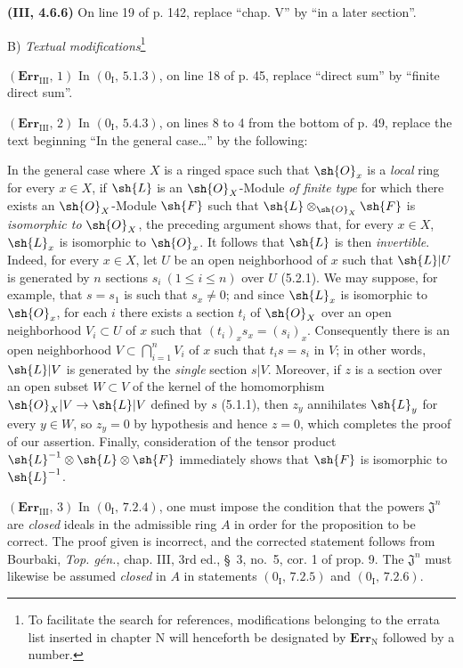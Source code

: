 \noindent\textbf{(III, 4.6.6)} On line 19 of p. 142, replace ``chap. V'' by
``in a later section''.

\begin{center}
B) \emph{Textual modifications}\footnote{To facilitate the search for
references, modifications belonging to the errata list inserted in chapter N
will henceforth be designated by $\mathbf{Err}_{\mathrm N}$ followed by a
number.}
\end{center}

\noindent\textbf{$(\mathbf{Err}_{\mathrm{III}},\,1)$} In
$(0_{\mathrm I},\,5.1.3)$, on line 18 of p. 45, replace ``direct sum'' by
``finite direct sum''.

\noindent\textbf{$(\mathbf{Err}_{\mathrm{III}},\,2)$} In
$(0_{\mathrm I},\,5.4.3)$, on lines 8 to 4 from the bottom of p. 49, replace
the text beginning ``In the general case\ldots{}'' by the following:

In the general case where $X$ is a ringed space such that $\sh{O}_x$ is a
\emph{local} ring for
every $x\in X$, if $\sh{L}$ is an $\sh{O}_X$-Module \emph{of finite type} for
which there exists an $\sh{O}_X$-Module $\sh{F}$ such that
$\sh{L}\otimes_{\sh{O}_X}\sh{F}$ is \emph{isomorphic to} $\sh{O}_X$, the
preceding argument shows that, for every $x\in X$, $\sh{L}_x$ is isomorphic to
$\sh{O}_x$. It follows that $\sh{L}$ is then \emph{invertible}. Indeed, for
every $x\in X$, let $U$ be an open neighborhood of $x$ such that $\sh{L}|U$ is
generated by $n$ sections $s_i\ (1\leq i\leq n)$ over $U$ (5.2.1). We may
suppose, for example, that $s=s_1$ is such that $s_x\ne0$; and since
$\sh{L}_x$ is isomorphic to $\sh{O}_x$, for each $i$ there exists a section
$t_i$ of $\sh{O}_X$ over an open neighborhood $V_i\subset U$ of $x$ such that
$(t_i)_x s_x=(s_i)_x$. Consequently there is an open neighborhood
$V\subset\bigcap_{i=1}^nV_i$ of $x$ such that $t_i s=s_i$ in $V$; in other
words, $\sh{L}|V$ is generated by the \emph{single} section $s|V$. Moreover,
if $z$ is a section over an open subset $W\subset V$ of the kernel of the
homomorphism $\sh{O}_X|V\to\sh{L}|V$ defined by $s$ (5.1.1), then $z_y$
annihilates $\sh{L}_y$ for every $y\in W$, so $z_y=0$ by hypothesis and hence
$z=0$, which completes the proof of our assertion. Finally, consideration of
the tensor product $\sh{L}^{-1}\otimes\sh{L}\otimes\sh{F}$ immediately shows
that $\sh{F}$ is isomorphic to $\sh{L}^{-1}$.

\noindent\textbf{$(\mathbf{Err}_{\mathrm{III}},\,3)$} In
$(0_{\mathrm I},\,7.2.4)$, one must impose the condition that the powers
$\mathfrak J^n$ are \emph{closed} ideals in the admissible ring $A$ in order
for the proposition to be correct. The proof given is incorrect, and the
corrected statement follows from Bourbaki, \emph{Top. gén.}, chap. III, 3rd
ed., \S~3, no.~5, cor. 1 of prop. 9. The $\mathfrak J^n$ must likewise be
assumed \emph{closed} in $A$ in statements $(0_{\mathrm I},\,7.2.5)$ and
$(0_{\mathrm I},\,7.2.6)$.


